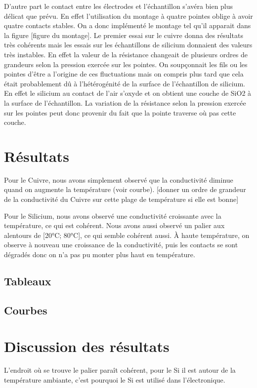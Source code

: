 D'autre part le contact entre les électrodes et l'échantillon s'avéra bien plus délicat que prévu. 
En effet l'utilisation du montage à quatre pointes oblige à avoir quatre contacts stables. On a donc implémenté 
le montage tel qu'il apparait dans la figure [figure du montage]. Le premier essai sur le cuivre donna des résultats 
très cohérents mais les essais sur les échantillons de silicium donnaient des valeurs très instables. 
En effet la valeur de la résistance changeait de plusieurs ordres de grandeurs selon la pression exercée sur les 
pointes. On soupçonnait les fils ou les pointes d'être a l'origine de ces fluctuations 
mais on compris plus tard que cela était probablement dû à l'hétérogénité de la surface de l'échantillon de silicium. 
En effet le silicium au contact de l'air s'oxyde et on obtient une couche de SiO2 à la surface de l'échantillon. 
La variation de la résistance selon la pression exercée sur les pointes peut donc provenir du fait que la pointe 
traverse où pas cette couche.

\section*{Résultats}
Pour le Cuivre, nous avons simplement observé que la conductivité diminue quand on augmente la température (voir courbe).
[donner un ordre de grandeur de la conductivité du Cuivre sur cette plage de température si elle est bonne]


Pour le Silicium, nous avons observé une conductivité croissante avec la température, ce qui est cohérent. Nous avons aussi observé un palier aux alentours de [20°C; 80°C], ce qui semble cohérent aussi.
À haute température, on observe à nouveau une croissance de la conductivité, 
puis les contacts se sont dégradés donc on n'a pas pu monter plus haut en température.


\subsection*{Tableaux}

\subsection*{Courbes}


\section*{Discussion des résultats}
L'endroit où se trouve le palier paraît cohérent, pour le Si il est autour de la température ambiante, c'est pourquoi le Si est utilisé dans l'électronique.


